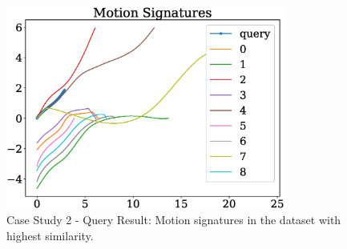 \documentclass[twocolumn,10pt]{asme2ej}
\begin{document}
\begin{figure}
\centering
\includegraphics[width=260pt]{figure/fig_ex_motion_signatures.eps}
  \caption{Case Study 2 - Query Result: Motion signatures in the dataset with highest similarity.}
\label{queryResult}
\end{figure}
\end{document}
